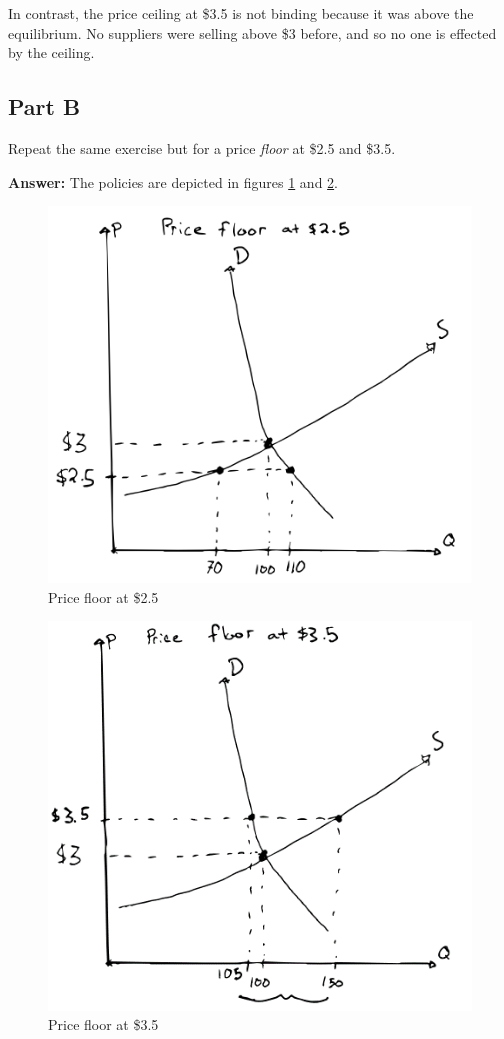 \documentclass[12pt]{article}
\begin{document}
\vspace{2mm}

In contrast, the price ceiling at \$3.5 is not binding because it was above the equilibrium. No suppliers were selling above \$3 before, and so no one is effected by the ceiling.

\subsection*{Part B}
Repeat the same exercise but for a price \textit{floor} at \$2.5 and \$3.5.

\textbf{Answer:}
The policies are depicted in figures \ref{fig:coffee_floor_250} and \ref{fig:coffee_floor_350}.

\begin{figure}
    \centering
    \includegraphics[width=.6\textwidth]{coffee_floor_250.png}
    \caption{Price floor at \$2.5}
    \label{fig:coffee_floor_250}
\end{figure}

\begin{figure}
    \centering
    \includegraphics[width=.6\textwidth]{coffee_floor_350.png}
    \caption{Price floor at \$3.5}
    \label{fig:coffee_floor_350}
\end{figure}
\end{document}
